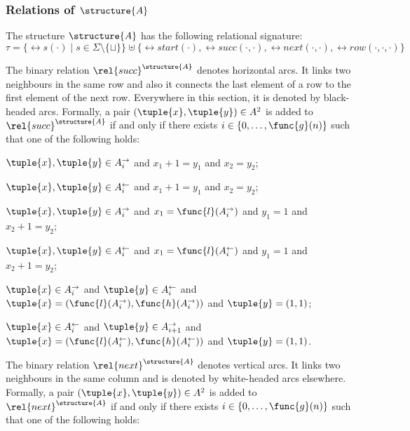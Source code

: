 \documentclass{lmcs}
\begin{document}
\subsubsection*{Relations of $\structure{A}$}
The structure $\structure{A}$ has the following relational signature:
\begin{equation*}
\tau = \bigl\{\rel{s}(\cdot)\mid s\in\Sigma\setminus\{\sqcup\}\bigr\}\uplus\bigl\{\rel{start}(\cdot), \rel{succ}(\cdot,\cdot), \rel{next}(\cdot,\cdot),\rel{row}(\cdot,\cdot,\cdot)\bigr\}
\end{equation*}
\begin{compactitem}
\item The binary relation $\rel{succ}^\structure{A}$ denotes horizontal arcs.
It links two neighbours in the same row and also it connects the last element of a row to the first element of the next row. 
Everywhere in this section, it is denoted by black-headed arcs.
Formally, a pair $(\tuple{x},\tuple{y})\in A^2$ is added to $\rel{succ}^\structure{A}$ if and only if there exists $i\in\{0,\ldots,\func{g}(n)\}$ such that one of the following holds:
\begin{compactitem}
\item $\tuple{x},\tuple{y}\in A_i^\rightarrow$ and $x_1+1=y_1$ and $x_2=y_2$;
\item $\tuple{x},\tuple{y}\in A_i^\leftarrow$ and $x_1+1=y_1$ and $x_2=y_2$;
\item $\tuple{x},\tuple{y}\in A_i^\rightarrow$ and $x_1=\func{l}(A_i^\rightarrow)$ and $y_1=1$ and $x_2+1=y_2$;
\item $\tuple{x},\tuple{y}\in A_i^\leftarrow$ and $x_1=\func{l}(A_i^\leftarrow)$ and $y_1=1$ and $x_2+1=y_2$;
\item $\tuple{x}\in A_i^\rightarrow$ and $\tuple{y}\in A_i^\leftarrow$ and $\tuple{x} = (\func{l}(A_i^\rightarrow), \func{h}(A_i^\rightarrow))$ and $\tuple{y} = (1, 1)$;
\item $\tuple{x}\in A_i^\leftarrow$ and $\tuple{y}\in A_{i+1}^\rightarrow$ and $\tuple{x} = (\func{l}(A_i^\leftarrow), \func{h}(A_i^\leftarrow))$ and $\tuple{y} = (1, 1)$.
\end{compactitem}
\item The binary relation $\rel{next}^\structure{A}$ denotes vertical arcs.
It links two neighbours in the same column and is denoted by white-headed arcs elsewhere.
Formally, a pair $(\tuple{x},\tuple{y})\in A^2$ is added to $\rel{next}^\structure{A}$ if and only if there exists $i\in\{0,\ldots,\func{g}(n)\}$ such that one of the following holds:
\begin{compactitem}

\end{compactitem}
\end{compactitem}
\end{document}
